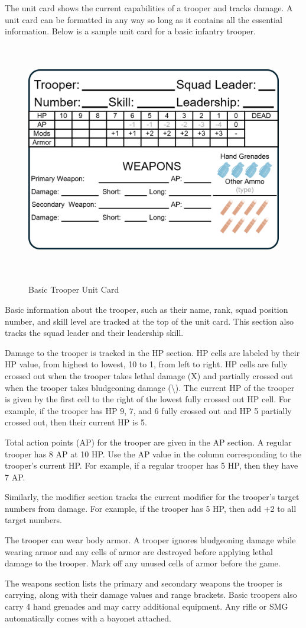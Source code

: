 The unit card shows the current capabilities of a trooper and tracks damage.
A unit card can be formatted in any way so long as it contains all the essential information.
Below is a sample unit card for a basic infantry trooper.

\begin{figure}[H]
  \centering
  \includegraphics[alt='Sample Basic Trooper', width=5.63in, height=4in]{img/BasicTrooper.png}
  \caption*{Basic Trooper Unit Card}
\end{figure}

Basic information about the trooper, such as their name, rank, squad position number, and skill level are tracked at the top of the unit card.
This section also tracks the squad leader and their leadership skill.

Damage to the trooper is tracked in the HP section.
HP cells are labeled by their HP value, from highest to lowest, 10 to 1, from left to right.
HP cells are fully crossed out when the trooper takes lethal damage (X) and partially crossed out when the trooper takes bludgeoning damage (\textbackslash).
The current HP of the trooper is given by the first cell to the right of the lowest fully crossed out HP cell.
For example, if the trooper has HP 9, 7, and 6 fully crossed out and HP 5 partially crossed out, then their current HP is 5.

Total action points (AP) for the trooper are given in the AP section.
A regular trooper has 8 AP at 10 HP.
Use the AP value in the column corresponding to the trooper's current HP.
For example, if a regular trooper has 5 HP, then they have 7 AP.

Similarly, the modifier section tracks the current modifier for the trooper's target numbers from damage.
For example, if the trooper has 5 HP, then add +2 to all target numbers.

The trooper can wear body armor.
A trooper ignores bludgeoning damage while wearing armor and any cells of armor are destroyed before applying lethal damage to the trooper.
Mark off any unused cells of armor before the game.

The weapons section lists the primary and secondary weapons the trooper is carrying, along with their damage values and range brackets.
Basic troopers also carry 4 hand grenades and may carry additional equipment.
Any rifle or SMG automatically comes with a bayonet attached.
